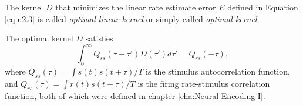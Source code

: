 \begin{defn}
  \label{def:optimalKernel}
  The kernel $D$ that minimizes the linear rate estimate error $E$ defined in Equation \ref{equ:2.3} is called \emph{optimal linear kernel} or simply called \emph{optimal kernel}.
\end{defn}

\begin{prop}
  \label{prop:OptimalLinearKernel}
  The optimal kernel $D$ satisfies
  \begin{equation}
    \label{equ:2.4}
    \int_0^{\infty}Q_{ss}(\tau-\tau')D(\tau')d\tau' = Q_{rs}(-\tau),
  \end{equation}
  where $Q_{ss}(\tau) = \int s(t)s(t+\tau)/T$ is the stimulus autocorrelation function, and $Q_{rs}(\tau) = \int r(t)s(t+\tau)/T$ is the firing rate-stimulus correlation function, both of which were defined in chapter \ref{cha:Neural Encoding I}.
\end{prop}
